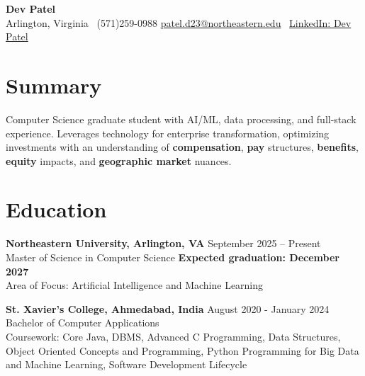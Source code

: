 \documentclass[a4paper,10pt]{article}
\begin{document}
\begin{center}
\vspace{-3mm}
    \fontsize{16}{18}\selectfont \textbf{Dev Patel} \\
    \vspace{0mm}
    \normalsize Arlington, Virginia \textbar\ (571)259-0988  \textbar       \href{mailto:patel.d23@northeastern.edu}{patel.d23@northeastern.edu} \textbar\ \href{https://www.linkedin.com/in/devxpatel//}{LinkedIn: Dev Patel} \\
\end{center}



\section*{Summary}
Computer Science graduate student with AI/ML, data processing, and full-stack experience. Leverages technology for enterprise transformation, optimizing investments with an understanding of \textbf{compensation}, \textbf{pay} structures, \textbf{benefits}, \textbf{equity} impacts, and \textbf{geographic market} nuances.
 
\vspace{ 0 mm}
\section*{Education}
\textbf{Northeastern University, Arlington, VA} \hfill September 2025 -- Present\\
Master of Science in Computer Science \hfill \textbf{Expected graduation: December 2027} \\
Area of Focus: Artificial Intelligence and Machine Learning

\vspace{1 mm} %
\textbf{St. Xavier's College, Ahmedabad, India} \hfill August 2020 - January 2024 \\
Bachelor of Computer Applications\\
Coursework: Core Java, DBMS, Advanced C Programming, Data Structures, Object Oriented Concepts and Programming, Python Programming for Big Data and Machine Learning, Software Development Lifecycle
\end{document}
